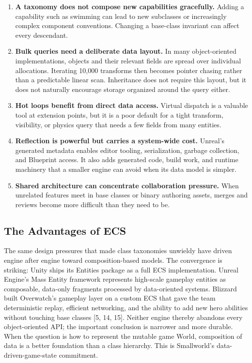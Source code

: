 \documentclass[
  11pt,
  letterpaper,
  DIV=11,
  numbers=noendperiod,
  twoside,
  open=right]{scrreprt}
\begin{document}
\begin{enumerate}
\def\labelenumi{\arabic{enumi}.}
\item
  \textbf{A taxonomy does not compose new capabilities gracefully.}
  Adding a capability such as swimming can lead to new subclasses or
  increasingly complex component conventions. Changing a base-class
  invariant can affect every descendant.
\item
  \textbf{Bulk queries need a deliberate data layout.} In many
  object-oriented implementations, objects and their relevant fields are
  spread over individual allocations. Iterating 10,000 transforms then
  becomes pointer chasing rather than a predictable linear scan.
  Inheritance does not require this layout, but it does not naturally
  encourage storage organized around the query either.
\item
  \textbf{Hot loops benefit from direct data access.} Virtual dispatch
  is a valuable tool at extension points, but it is a poor default for a
  tight transform, visibility, or physics query that needs a few fields
  from many entities.
\item
  \textbf{Reflection is powerful but carries a system-wide cost.}
  Unreal's generated metadata enables editor tooling, serialization,
  garbage collection, and Blueprint access. It also adds generated code,
  build work, and runtime machinery that a smaller engine can avoid when
  its data model is simpler.
\item
  \textbf{Shared architecture can concentrate collaboration pressure.}
  When unrelated features meet in base classes or binary authoring
  assets, merges and reviews become more difficult than they need to be.
\end{enumerate}

\subsection{The Advantages of ECS}\label{the-advantages-of-ecs}

The same design pressures that made class taxonomies unwieldy have
driven engine after engine toward composition-based models. The
convergence is striking: Unity ships its Entities package as a full ECS
implementation. Unreal Engine's Mass Entity framework represents
high-scale gameplay entities as composable, data-only fragments
processed by data-oriented systems. Blizzard built Overwatch's gameplay
layer on a custom ECS that gave the team deterministic replay, efficient
networking, and the ability to add new hero abilities without touching
base classes {[}5, 14, 15{]}. Neither engine thereby abandons every
object-oriented API; the important conclusion is narrower and more
durable. When the question is how to represent the mutable game World,
composition of data is a better foundation than a class hierarchy. This
is Smallworld's data-driven-game-state commitment.
\end{document}
